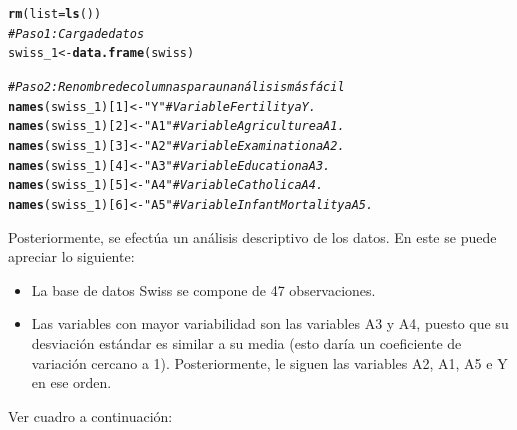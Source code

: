 \documentclass[10pt,a4paper]{article}\usepackage[]{graphicx}\usepackage[]{color}
\makeatletter
\newcommand{\hlnum}[1]{\textcolor[rgb]{0.686,0.059,0.569}{#1}}%
\newcommand{\hlstr}[1]{\textcolor[rgb]{0.192,0.494,0.8}{#1}}%
\newcommand{\hlcom}[1]{\textcolor[rgb]{0.678,0.584,0.686}{\textit{#1}}}%
\newcommand{\hlstd}[1]{\textcolor[rgb]{0.345,0.345,0.345}{#1}}%
\newcommand{\hlkwb}[1]{\textcolor[rgb]{0.69,0.353,0.396}{#1}}%
\newcommand{\hlkwc}[1]{\textcolor[rgb]{0.333,0.667,0.333}{#1}}%
\newcommand{\hlkwd}[1]{\textcolor[rgb]{0.737,0.353,0.396}{\textbf{#1}}}%
\newenvironment{kframe}{%
 \def\at@end@of@kframe{}%
 \ifinner\ifhmode%
  \def\at@end@of@kframe{\end{minipage}}%
  \begin{minipage}{\columnwidth}%
 \fi\fi%
 \def\FrameCommand##1{\hskip\@totalleftmargin \hskip-\fboxsep
 \colorbox{shadecolor}{##1}\hskip-\fboxsep
     \hskip-\linewidth \hskip-\@totalleftmargin \hskip\columnwidth}%
 \MakeFramed {\advance\hsize-\width
   \@totalleftmargin\z@ \linewidth\hsize
   \@setminipage}}%
 {\par\unskip\endMakeFramed%
 \at@end@of@kframe}
\newenvironment{knitrout}{}{} %
\makeatother
\begin{document}
\begin{knitrout}\small
{}\color{fgcolor}\begin{kframe}
\begin{alltt}
\hlkwd{rm}\hlstd{(}\hlkwc{list} \hlstd{=} \hlkwd{ls}\hlstd{())}
\hlcom{# Paso 1: Carga de datos}
\hlstd{swiss_1} \hlkwb{<-} \hlkwd{data.frame}\hlstd{(swiss)}

\hlcom{# Paso 2: Renombre de columnas para un análisis más fácil}
\hlkwd{names}\hlstd{(swiss_1)[}\hlnum{1}\hlstd{]} \hlkwb{<-} \hlstr{"Y"}  \hlcom{#Variable Fertility a Y.}
\hlkwd{names}\hlstd{(swiss_1)[}\hlnum{2}\hlstd{]} \hlkwb{<-} \hlstr{"A1"}  \hlcom{#Variable Agriculture a A1.}
\hlkwd{names}\hlstd{(swiss_1)[}\hlnum{3}\hlstd{]} \hlkwb{<-} \hlstr{"A2"}  \hlcom{#Variable Examination a A2.}
\hlkwd{names}\hlstd{(swiss_1)[}\hlnum{4}\hlstd{]} \hlkwb{<-} \hlstr{"A3"}  \hlcom{#Variable Education a A3.}
\hlkwd{names}\hlstd{(swiss_1)[}\hlnum{5}\hlstd{]} \hlkwb{<-} \hlstr{"A4"}  \hlcom{#Variable Catholic a A4.}
\hlkwd{names}\hlstd{(swiss_1)[}\hlnum{6}\hlstd{]} \hlkwb{<-} \hlstr{"A5"}  \hlcom{#Variable Infant Mortality a A5.}
\end{alltt}
\end{kframe}
\end{knitrout}

Posteriormente, se efectúa un análisis descriptivo de los datos. En este se puede apreciar lo siguiente:
\begin{itemize}
	\item La base de datos Swiss se compone de 47 observaciones.
	\item Las variables con mayor variabilidad son las variables A3 y A4, puesto que su desviación estándar es similar a su media (esto daría un coeficiente de variación cercano a 1). Posteriormente, le siguen las variables A2, A1, A5 e Y en ese orden.
\end{itemize}

Ver cuadro a continuación:
\end{document}
